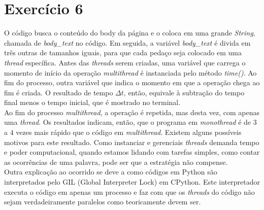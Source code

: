 \documentclass[a4paper,12pt]{article}
\begin{document}
\section{Exercício 6}
O código busca o conteúdo do body da página e o coloca em uma grande \textit{String}, chamada de \textit{body\_text} no código.
Em seguida, a variável \textit{body\_text} é divida em três outras de tamanhos iguais, para que cada pedaço seja colocado em uma \textit{thread} específica. Antes das \textit{threads} serem criadas, uma variável que carrega o momento de início da operação \textit{multithread} é instanciada pelo método \textit{time()}. 
Ao fim do processo, outra variável que indica o momento em que a operação chega ao fim é criada. O resultado de tempo $\Delta t$, então, equivale à subtração do tempo final menos o tempo inicial, que é mostrado no terminal.\\
Ao fim do processo \textit{multithread}, a operação é repetida, mas desta vez, com apenas uma \textit{thread}. Os resultados indicam, então, que o programa em \textit{monothread} é de $3$ a $4$ vezes mais rápido que o código em \textit{multithread}.
Existem alguns possíveis motivos para este resultado. Como instanciar e gerenciais \textit{threads} demanda tempo e poder computacional, quando estamos lidando com tarefas simples, como contar as ocorrências de uma palavra, pode ser que a estratégia não compense.\\
Outra explicação ao ocorrido se deve a como códigos em Python são interpretados pelo GIL (Global Interpreter Lock) em CPython. Este interpretador executa o código em apenas um processo e faz com que os \textit{threads} do código não sejam verdadeiramente paralelos como teoricamente devem ser.
\end{document}
